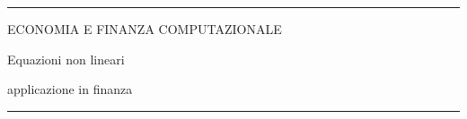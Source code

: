 \documentclass[12pt,aspectratio=169]{beamer}
\begin{document}
\begin{frame}
\unitlength 5mm

\begin{center}

\rule{\textwidth}{2pt}

\vskip3mm
ECONOMIA E FINANZA COMPUTAZIONALE

Equazioni non lineari

applicazione in finanza

\rule{\textwidth}{2pt}

\end{center}

\end{frame}


\end{document}
